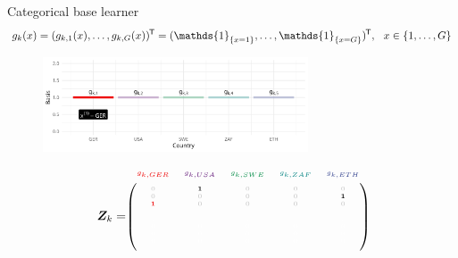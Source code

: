 \documentclass[t,10pt]{beamer}
\begin{document}
\begin{frame}{Categorical base learner}
  \vspace{-0.3cm}\[g_k(x) = (g_{k,1}(x), \dots, g_{k,G}(x))^\tran = (\mathds{1}_{\{x = 1\}}, \dots, \mathds{1}_{\{x = G\}})^\tran, \ \ x\in\{1, \dots, G\}\]
  \begin{center}
    \begin{figure}
      \includegraphics[width=0.7\textwidth]{figures/bs-cat/fig-cat3.png}
    \end{figure}
    \vspace{-0.5cm}
    \[
      \design_k = \tiny\begin{blockarray}{ccccc}
        \color[HTML]{EE0000}g_{k,GER} & \color[HTML]{631879}g_{k,USA} & \color[HTML]{008B45}g_{k,SWE} & \color[HTML]{008280}g_{k,ZAF} & \color[HTML]{3B4992}g_{k,ETH}\\
      \begin{block}{(ccccc)}
        \phantom{x}\\
        \color{lightgray}0 & \color{black}\bm{1} & \color{lightgray}0 & \color{lightgray}0 & \color{lightgray}0 \\
        \color{lightgray}0 & \color{lightgray}0 & \color{lightgray}0 & \color{lightgray}0 & \color{black}\bm{1} \\
        \color[HTML]{EE0000}\bm{1} & \color{lightgray}0 & \color{lightgray}0 & \color{lightgray}0 & \color{lightgray}0 \\
        \color{white}\vdots & \color{white}\vdots & \color{white}\vdots & \color{white}\vdots & \color{white}\vdots \\
        \color{white}0 & \color{white}0 & \color{white}0 & \color{white}0 & \color{white}0 \\
        \color{white}0 & \color{white}0 & \color{white}0 & \color{white}0 & \color{white}0 \\
        \color{white}0 & \color{white}0 & \color{white}0 & \color{white}0 & \color{white}0 \color{black}\\
        \phantom{x}\\
      \end{block}
    \end{blockarray}
    \]
    \normalsize
  \end{center}
  \addtocounter{framenumber}{-1}
\end{frame}
\end{document}
